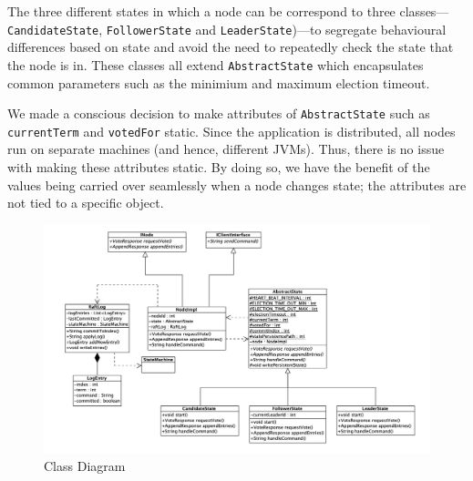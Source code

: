 \documentclass[12pt, a4paper]{article}
\begin{document}
The three different states in which a node can be correspond to three classes---\texttt{CandidateState}, \texttt{FollowerState} and \texttt{LeaderState})---to segregate behavioural differences based on state and avoid the need to repeatedly check the state that the node is in. These classes all extend \texttt{AbstractState} which encapsulates common parameters such as the minimium and maximum election timeout.

We made a conscious decision to make attributes of \texttt{AbstractState} such as \texttt{currentTerm} and \texttt{votedFor} static. Since the application is distributed, all nodes run on separate machines (and hence, different JVMs). Thus, there is no issue with making these attributes static. By doing so, we have the benefit of the values being carried over seamlessly when a node changes state; the attributes are not tied to a specific object.

\begin{figure}[htp]
  \centering
  \includegraphics[width=1\textwidth]{img/class-diragram.png}
  \caption{Class Diagram}
  \label{fig:uml}
\end{figure}
\end{document}
